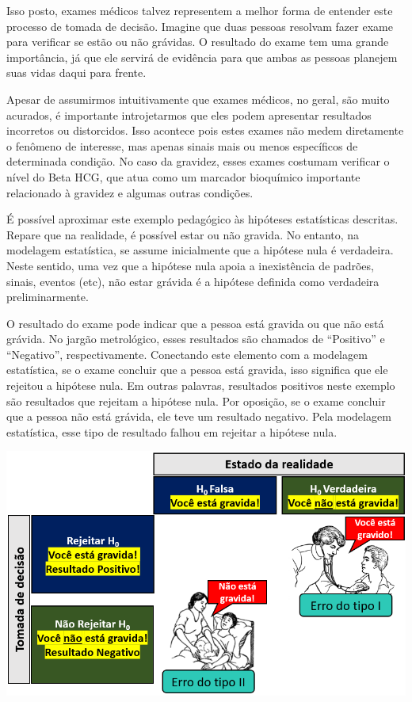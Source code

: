 \documentclass[
]{book}
\begin{document}
Isso posto, exames médicos talvez representem a melhor forma de entender
este processo de tomada de decisão. Imagine que duas pessoas resolvam
fazer exame para verificar se estão ou não grávidas. O resultado do
exame tem uma grande importância, já que ele servirá de evidência para
que ambas as pessoas planejem suas vidas daqui para frente.

Apesar de assumirmos intuitivamente que exames médicos, no geral, são
muito acurados, é importante introjetarmos que eles podem apresentar
resultados incorretos ou distorcidos. Isso acontece pois estes exames
não medem diretamente o fenômeno de interesse, mas apenas sinais mais ou
menos específicos de determinada condição. No caso da gravidez, esses
exames costumam verificar o nível do Beta HCG, que atua como um marcador
bioquímico importante relacionado à gravidez e algumas outras condições.

É possível aproximar este exemplo pedagógico às hipóteses estatísticas
descritas. Repare que na realidade, é possível estar ou não gravida. No
entanto, na modelagem estatística, se assume inicialmente que a hipótese
nula é verdadeira. Neste sentido, uma vez que a hipótese nula apoia a
inexistência de padrões, sinais, eventos (etc), não estar grávida é a
hipótese definida como verdadeira preliminarmente.

O resultado do exame pode indicar que a pessoa está gravida ou que não
está grávida. No jargão metrológico, esses resultados são chamados de
``Positivo'' e ``Negativo'', respectivamente. Conectando este elemento
com a modelagem estatística, se o exame concluir que a pessoa está
gravida, isso significa que ele rejeitou a hipótese nula. Em outras
palavras, resultados positivos neste exemplo são resultados que rejeitam
a hipótese nula. Por oposição, se o exame concluir que a pessoa não está
grávida, ele teve um resultado negativo. Pela modelagem estatística,
esse tipo de resultado falhou em rejeitar a hipótese nula.

\includegraphics{./img/cap_inferencia_tabela_decisao2.png}
\end{document}
